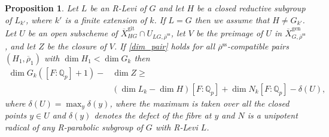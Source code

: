 \documentclass{amsart}
\newtheorem{prop}{Proposition}[section]
\theoremstyle{definition}
\theoremstyle{remark}
\newcommand{\Qp}{\mathbb {Q}_p}
\newcommand{\rhobar}{\overline{\rho}}
\newcommand{\gen}{\mathrm{gen}}
\newcommand{\gps}{\mathrm{git}}
\newcommand{\Xbar}{\overline{X}}
\newcommand{\rhobarss}{\rhobar^{\mathrm{ss}}}
\begin{document}
\begin{prop}\label{mother_bound} Let $L$ be an R-Levi of $G$ and let $H$ be a closed reductive subgroup of $L_{k'}$, where 
$k'$ is a finite extension of $k$. If $L=G$ then we assume that $H\neq G_{k'}$. 
Let $U$ be an open subscheme of $\Xbar^{\gps}_{HG}\cap U_{LG, \rhobarss}$, let 
$V$ be the preimage of $U$ in $\Xbar^{\gen}_{G, \rhobarss}$, and let $Z$ be the closure of $V$.
If \eqref{dim_pair} holds for all $\rhobarss$-compatible pairs $(H_1, \rhobar_1)$ with $\dim H_1< \dim G_k$ then
\begin{equation}\begin{split}\label{seventh_ofmany}
\dim G_k ([F:\Qp]+1) -&\dim Z \ge \\&(\dim L_k - \dim H)[F:\Qp] + \dim N_k[F:\Qp]-\delta(U), 
\end{split}
\end{equation}
where $\delta(U)=\max_y \delta(y)$, where the maximum is taken over all the closed points 
$y\in U$ and $\delta(y)$ denotes the defect of the fibre at $y$ and $N$ is a unipotent 
radical of any R-parabolic subgroup of $G$ with R-Levi $L$. 
\end{prop}
\end{document}
